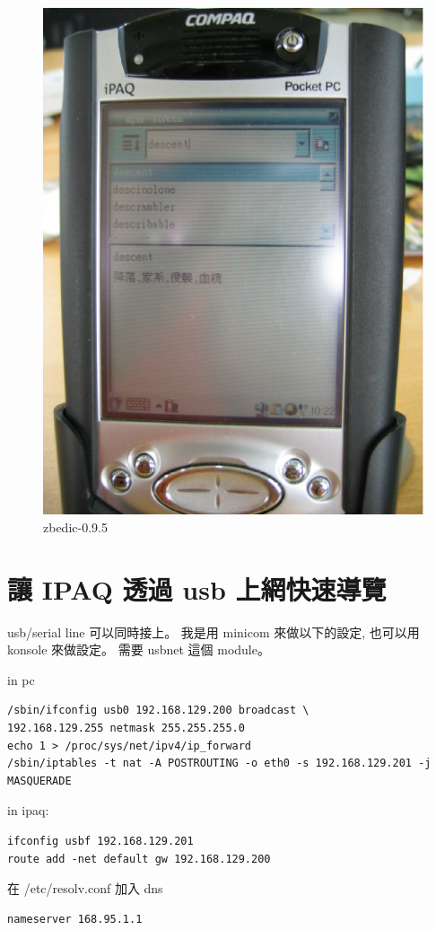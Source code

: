 \documentclass[12pt,a4paper]{article}
\begin{document}
\begin{CJK}{UTF8}{cwmu}
\begin{figure}[htbp]
\centering
\includegraphics[scale=0.3]{eps/zbedic-0.9.5.eps}
\caption{zbedic-0.9.5}
\end{figure}

\section{讓 IPAQ 透過 usb 上網快速導覽}
usb/serial line 可以同時接上。
我是用 minicom 來做以下的設定,
也可以用 konsole 來做設定。
需要 usbnet 這個 module。

in pc

\begin{verbatim}
/sbin/ifconfig usb0 192.168.129.200 broadcast \
192.168.129.255 netmask 255.255.255.0
echo 1 > /proc/sys/net/ipv4/ip_forward
/sbin/iptables -t nat -A POSTROUTING -o eth0 -s 192.168.129.201 -j MASQUERADE
\end{verbatim}

\noindent
in ipaq:
\begin{verbatim}
ifconfig usbf 192.168.129.201
route add -net default gw 192.168.129.200
\end{verbatim}
在 /etc/resolv.conf 加入 dns
\begin{verbatim}
nameserver 168.95.1.1
\end{verbatim}




\end{CJK}
\end{document}
